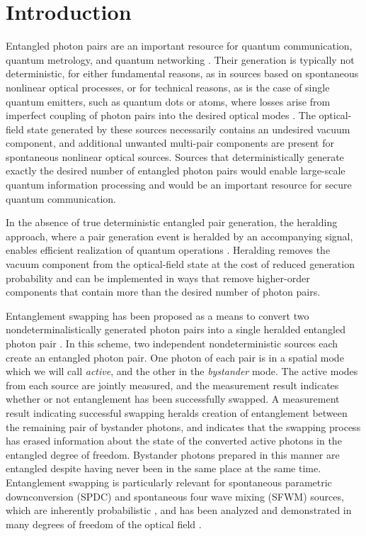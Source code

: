 \documentclass[twocolumn,amssymb, nobibnotes, showpacs, aps, pra,10pt]{revtex4-1}
\begin{document}
\maketitle %

\section{Introduction}

Entangled photon pairs are an important resource for quantum communication, quantum metrology, and quantum networking \cite{Gisin2007,Torres2011}. Their generation is typically not deterministic, for either fundamental reasons, as in sources based on spontaneous nonlinear optical processes, or for technical reasons, as is the case of single quantum emitters, such as quantum dots or atoms, where losses arise from imperfect coupling of photon pairs into the desired optical modes \cite{Takeuchi2013}. The optical-field state generated by these sources necessarily contains an undesired vacuum component, and additional unwanted multi-pair components are present for spontaneous nonlinear optical sources. Sources that deterministically generate exactly the desired number of entangled photon pairs would enable large-scale quantum information processing and would be an important resource for secure quantum communication.

In the absence of true deterministic entangled pair generation, the heralding approach, where a pair generation event is heralded by an accompanying signal, enables efficient realization of quantum operations \cite{Barz2010}. Heralding removes the vacuum component from the optical-field state at the cost of reduced generation probability and can be implemented in ways that remove higher-order components that contain more than the desired number of photon pairs.

Entanglement swapping has been proposed as a means to convert two nondeterminalistically generated photon pairs into a single heralded entangled photon pair \cite{Yurke1992, Zukowski1993}. In this scheme, two independent nondeterministic sources each create an entangled photon pair. One photon of each pair is in a spatial mode which we will call {\em active}, and the other in the {\em bystander} mode.  The active modes from each source are jointly measured, and the measurement result indicates whether or not entanglement has been successfully swapped. A measurement result indicating successful swapping heralds creation of entanglement between the remaining pair of bystander photons, and indicates that the swapping process has erased information about the state of the converted active photons in the entangled degree of freedom. Bystander photons prepared in this manner are entangled despite having never been in the same place at the same time. Entanglement swapping is particularly relevant for spontaneous parametric downconversion (SPDC) and spontaneous four wave mixing (SFWM) sources, which are inherently probabilistic \cite{Torres2011}, and has been analyzed and demonstrated in many degrees of freedom of the optical field \cite{Jennewein2001, Riedmatten2005,Takei2005,Kaltenbaek2009,Takesue2009, Sangouard2011,Jin2015, Zhang2016}.
\end{document}
